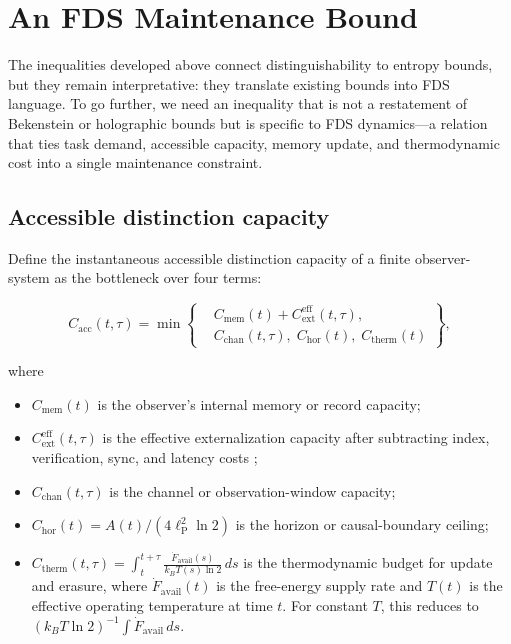 \documentclass[10pt,a4paper,twocolumn,aps,prl]{revtex4-2}
\newcommand{\ellP}{\ell_{\mathrm P}}
\begin{document}
\section{An FDS Maintenance Bound}

The inequalities developed above connect distinguishability to entropy bounds, but they remain interpretative: they translate existing bounds into FDS language. To go further, we need an inequality that is not a restatement of Bekenstein or holographic bounds but is specific to FDS dynamics---a relation that ties task demand, accessible capacity, memory update, and thermodynamic cost into a single maintenance constraint.

\subsection{Accessible distinction capacity}

Define the instantaneous accessible distinction capacity of a finite observer-system as the bottleneck over four terms:

\begin{equation}
C_{\mathrm{acc}}(t,\tau)
=
\min
\left\{
\begin{aligned}
&C_{\mathrm{mem}}(t)+C_{\mathrm{ext}}^{\mathrm{eff}}(t,\tau),\\
&C_{\mathrm{chan}}(t,\tau),\;
C_{\mathrm{hor}}(t),\;
C_{\mathrm{therm}}(t)
\end{aligned}
\right\},
\label{eq:cacc-bottleneck}
\end{equation}

where

\begin{itemize}
    \item $C_{\mathrm{mem}}(t)$ is the observer's internal memory or record capacity;
    \item $C_{\mathrm{ext}}^{\mathrm{eff}}(t,\tau)$ is the effective externalization capacity after subtracting index, verification, sync, and latency costs \cite{wufdsagency2026};
    \item $C_{\mathrm{chan}}(t,\tau)$ is the channel or observation-window capacity;
    \item $C_{\mathrm{hor}}(t)=A(t)/(4\ellP^2\ln2)$ is the horizon or causal-boundary ceiling;
    \item $C_{\mathrm{therm}}(t,\tau)=\displaystyle\int_t^{t+\tau}\frac{\dot F_{\mathrm{avail}}(s)}{k_B T(s)\ln 2}\,ds$ is the thermodynamic budget for update and erasure, where $\dot F_{\mathrm{avail}}(t)$ is the free-energy supply rate and $T(t)$ is the effective operating temperature at time $t$. For constant $T$, this reduces to $(k_B T\ln2)^{-1}\int\dot F_{\mathrm{avail}}\,ds$.
\end{itemize}
\end{document}
